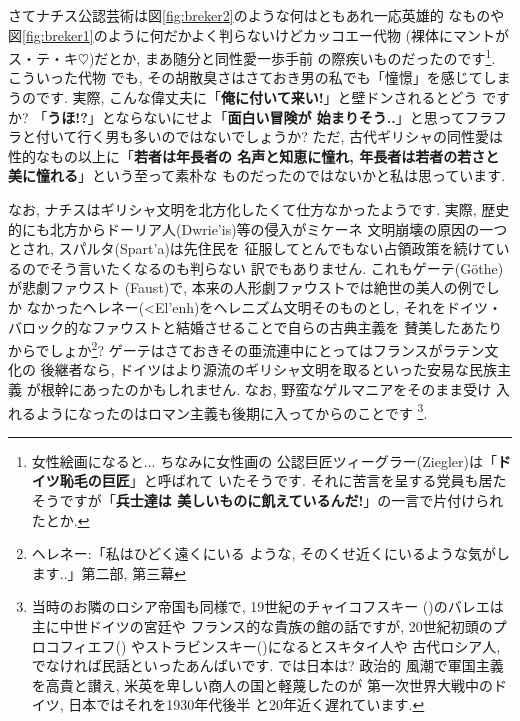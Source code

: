 \documentclass[b5j,8pt,twocolumn]{ltjsarticle}
\newcommand{\textgreek}[1]{\begingroup\fontencoding{LGR}\selectfont#1\endgroup}
\begin{document}
さてナチス公認芸術は図\ref{fig:breker2}のような何はともあれ一応英雄的
なものや図\ref{fig:breker1}のように何だかよく判らないけどカッコエー代物
(裸体にマントがス・テ・キ$\heartsuit$)だとか, まあ随分と同性愛一歩手前
の際疾いものだったのです\footnote{女性絵画になると... ちなみに女性画の
公認巨匠ツィーグラー(Ziegler)は「\textbf{ドイツ恥毛の巨匠}」と呼ばれて
いたそうです. それに苦言を呈する党員も居たそうですが「\textbf{兵士達は
美しいものに飢えているんだ!}」の一言で片付けられたとか.}. こういった代物
でも, その胡散臭さはさておき男の私でも「憧憬」を感じてしまうのです.
 実際, こんな偉丈夫に「\textbf{俺に付いて来い!}」と壁ドンされるとどう
ですか? 「\textbf{うほ!?}」とならないにせよ「\textbf{面白い冒険が
始まりそう..}」と思ってフラフラと付いて行く男も多いのではないでしょうか?
 ただ, 古代ギリシャの同性愛は性的なもの以上に「\textbf{若者は年長者の
名声と知恵に憧れ, 年長者は若者の若さと美に憧れる}」という至って素朴な
ものだったのではないかと私は思っています.
\newline

なお, ナチスはギリシャ文明を北方化したくて仕方なかったようです. 実際,
 歴史的にも北方からドーリア人(\textgreek{Dwrie'is})等の侵入がミケーネ
文明崩壊の原因の一つとされ, スパルタ(\textgreek{Spart'a})は先住民を
征服してとんでもない占領政策を続けているのでそう言いたくなるのも判らない
訳でもありません. これもゲーテ(G\"othe)が悲劇ファウスト
(Faust)\cite{ゲーテ}で, 本来の人形劇ファウストでは絶世の美人の例でしか
なかったヘレネー(\textgreek{<El'enh})をヘレニズム文明そのものとし,
 それをドイツ・バロック的なファウストと結婚させることで自らの古典主義を
賛美したあたりからでしょか\footnote{ヘレネー:「私はひどく遠くにいる
ような, そのくせ近くにいるような気がします..」\cite{ゲーテ}第二部,
第三幕}?  ゲーテはさておきその亜流連中にとってはフランスがラテン文化の
後継者なら, ドイツはより源流のギリシャ文明を取るといった安易な民族主義
が根幹にあったのかもしれません. なお, 野蛮なゲルマニアをそのまま受け
入れるようになったのはロマン主義も後期に入ってからのことです
\footnote{当時のお隣のロシア帝国も同様で, 19世紀のチャイコフスキー
({})のバレエは主に中世ドイツの宮廷や
フランス的な貴族の館の話ですが, 20世紀初頭のプロコフィエフ({})
やストラビンスキー({})になるとスキタイ人や
古代ロシア人, でなければ民話といったあんばいです. では日本は? 政治的
風潮で軍国主義を高貴と讃え, 米英を卑しい商人の国と軽蔑したのが
第一次世界大戦中のドイツ\cite{クラウス}, 日本ではそれを1930年代後半
と20年近く遅れています.}.
\newline
\end{document}
